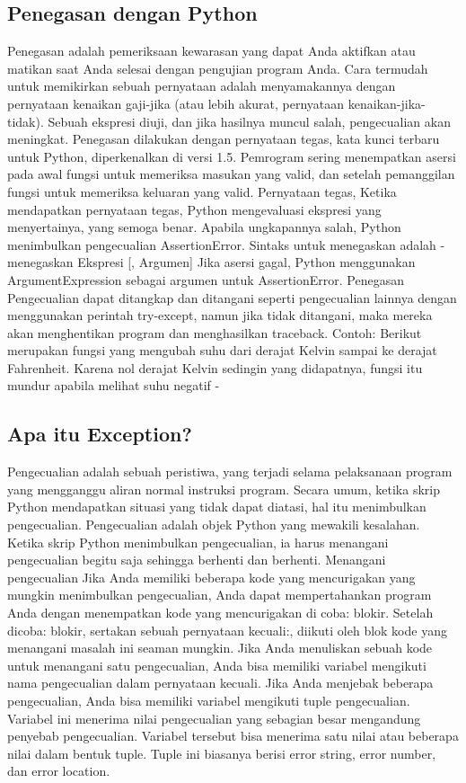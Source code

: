 \subsection{Penegasan dengan Python}
Penegasan adalah pemeriksaan kewarasan yang dapat Anda aktifkan atau matikan saat Anda selesai dengan pengujian program Anda.
Cara termudah untuk memikirkan sebuah pernyataan adalah menyamakannya dengan pernyataan kenaikan gaji-jika (atau lebih akurat, pernyataan kenaikan-jika-tidak). Sebuah ekspresi diuji, dan jika hasilnya muncul salah, pengecualian akan meningkat.
Penegasan dilakukan dengan pernyataan tegas, kata kunci terbaru untuk Python, diperkenalkan di versi 1.5.
Pemrogram sering menempatkan asersi pada awal fungsi untuk memeriksa masukan yang valid, dan setelah pemanggilan fungsi untuk memeriksa keluaran yang valid.
Pernyataan tegas, Ketika mendapatkan pernyataan tegas, Python mengevaluasi ekspresi yang menyertainya, yang semoga benar. Apabila ungkapannya salah, Python menimbulkan pengecualian AssertionError.
Sintaks untuk menegaskan adalah - menegaskan Ekspresi [, Argumen] 
Jika asersi gagal, Python menggunakan ArgumentExpression sebagai argumen untuk AssertionError. Penegasan Pengecualian dapat ditangkap dan ditangani seperti pengecualian lainnya dengan menggunakan perintah try-except, namun jika tidak ditangani, maka mereka akan menghentikan program dan menghasilkan traceback.
Contoh: 
Berikut merupakan fungsi yang mengubah suhu dari derajat Kelvin sampai ke derajat Fahrenheit. Karena nol derajat Kelvin sedingin yang didapatnya, fungsi itu mundur apabila melihat suhu negatif -

\subsection{Apa itu Exception?}
Pengecualian adalah sebuah peristiwa, yang terjadi selama pelaksanaan program yang mengganggu aliran normal instruksi program. Secara umum, ketika skrip Python mendapatkan situasi yang tidak dapat diatasi, hal itu menimbulkan pengecualian. Pengecualian adalah objek Python yang mewakili kesalahan. Ketika skrip Python menimbulkan pengecualian, ia harus menangani pengecualian begitu saja sehingga berhenti dan berhenti. Menangani pengecualian 
Jika Anda memiliki beberapa kode yang mencurigakan yang mungkin menimbulkan pengecualian, Anda dapat mempertahankan program Anda dengan menempatkan kode yang mencurigakan di coba: blokir. Setelah dicoba: blokir, sertakan sebuah pernyataan kecuali:, diikuti oleh blok kode yang menangani masalah ini seaman mungkin.
Jika Anda menuliskan sebuah kode untuk menangani satu pengecualian, Anda bisa memiliki variabel mengikuti nama pengecualian dalam pernyataan kecuali. Jika Anda menjebak beberapa pengecualian, Anda bisa memiliki variabel mengikuti tuple pengecualian.
Variabel ini menerima nilai pengecualian yang sebagian besar mengandung penyebab pengecualian. Variabel tersebut bisa menerima satu nilai atau beberapa nilai dalam bentuk tuple. Tuple ini biasanya berisi error string, error number, dan error location.

